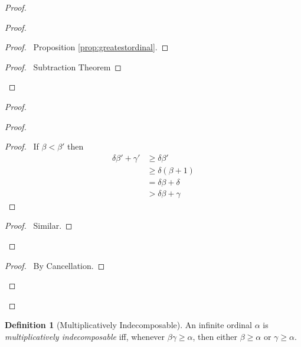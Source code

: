 \documentclass{book}
\let\qed\relax
\theoremstyle{definition}
\newtheorem{df}[ax]{Definition}
\begin{document}
\begin{proof}
\pf
{}
\begin{proof}
	\begin{proof}
		\pf\ Proposition \ref{prop:greatestordinal}.
	\end{proof}
	\begin{proof}
		\pf\ Subtraction Theorem
	\end{proof}
\end{proof}
\begin{proof}
	\begin{proof}
		\begin{proof}
			\pf\ If $\beta < \beta'$ then
			\begin{align*}
				\delta \beta' + \gamma' & \geq \delta \beta' \\
				& \geq \delta (\beta + 1) \\
				& = \delta \beta + \delta \\
				& > \delta \beta + \gamma
			\end{align*}
		\end{proof}
		\begin{proof}
			\pf\ Similar.
		\end{proof}
	\end{proof}
	\begin{proof}
		\pf\ By Cancellation.
	\end{proof}
\end{proof}
\qed
\end{proof}

\begin{df}[Multiplicatively Indecomposable]
An infinite ordinal $\alpha$ is \emph{multiplicatively indecomposable} iff, whenever $\beta \gamma \geq \alpha$, then either $\beta \geq \alpha$ or $\gamma \geq \alpha$.
\end{df}
\end{document}
